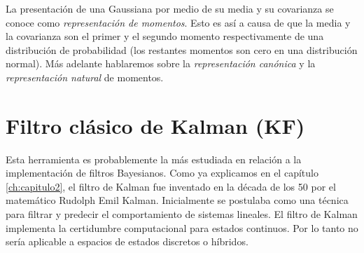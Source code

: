 La presentación de una Gaussiana por medio de su media y su covarianza se conoce como \textit{representación de momentos}.
Esto es así a causa de que la media y la covarianza son el primer y el segundo momento respectivamente de una distribución de probabilidad (los restantes momentos son cero en una distribución normal).
Más adelante hablaremos sobre la \textit{representación canónica} y la \textit{representación natural} de momentos.

\section{Filtro clásico de Kalman (KF)}
Esta herramienta es probablemente la más estudiada en relación a la implementación de filtros Bayesianos.
Como ya explicamos en el capítulo \ref{ch:capitulo2}, el filtro de Kalman fue inventado en la década de los 50 por el matemático Rudolph Emil Kalman. 
Inicialmente se postulaba como una técnica para filtrar y predecir el comportamiento de sistemas lineales.
El filtro de Kalman implementa la certidumbre computacional para estados continuos.
Por lo tanto no sería aplicable a espacios de estados discretos o híbridos.

